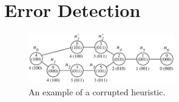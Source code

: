 \documentclass[letterpaper]{article}
\begin{document}




\section{Error Detection}


\begin{figure}[t]
\begin{center}
\includegraphics[width=240px]{figures/corruption_example5.pdf}
\caption{An example of a corrupted heuristic.}
\label{fig:corruption_example}
\end{center}
\end{figure}
\end{document}
